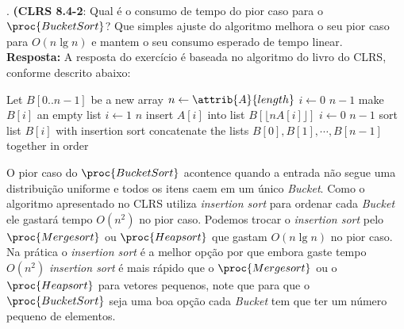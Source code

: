 \\[12pt]
. \textbf{(CLRS 8.4-2}: Qual é o consumo de tempo do pior caso para o $\proc{BucketSort}$? Que simples ajuste do algoritmo melhora o seu pior caso para $O(n \lg n)$ e mantem o seu consumo esperado de tempo linear.
\\[6pt]
\noindent \textbf{Resposta:} A resposta do exercício é baseada no algoritmo do livro do CLRS, conforme descrito abaixo:

\begin{codebox}
 \li Let $B[0..n-1]$ be a new array
 \li $n \gets \attrib{A}{length}$
 \li \For $i \gets 0$ \To $n-1$
 \li    \Do
	  make $B[i]$ an empty list
	\End
 \li \For $i \gets 1$ \To $n$
 \li	\Do
	  insert $A[i]$ into list $B[\lfloor nA[i] \rfloor]$
	\End
 \li \For $i \gets 0$ \To $n-1$
 \li	\Do
	  sort list $B[i]$ with insertion sort
	\End
 \li concatenate the lists $B[0], B[1], \cdots, B[n-1]$ together in order
\end{codebox}

\noindent O pior caso do $\proc{BucketSort}$ acontence quando a entrada não segue uma distribuição uniforme e todos os itens caem em um único \textit{Bucket}. Como o algoritmo apresentado no CLRS utiliza \textit{insertion sort} para ordenar cada \textit{Bucket} ele gastará tempo $O(n^2)$ no pior caso. Podemos trocar o \textit{insertion sort} pelo $\proc{Mergesort}$ ou $\proc{Heapsort}$ que gastam $O(n \lg n)$ no pior caso. Na prática o \textit{insertion sort} é a melhor opção por que embora gaste tempo $O(n^2)$ \textit{insertion sort} é mais rápido que o $\proc{Mergesort}$ ou o $\proc{Heapsort}$ para vetores pequenos, note que para que o $\proc{BucketSort}$ seja uma boa opção cada \textit{Bucket} tem que ter um número pequeno de elementos.\\[12pt]
